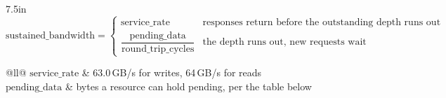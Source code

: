 \documentclass[border=8pt]{standalone}
\begin{document}
\begin{varwidth}{7.5in}
\[
  \mathrm{sustained\_bandwidth} =
  \begin{cases}
    \mathrm{service\_rate}
      & \text{responses return before the outstanding depth runs out}\\[1.2ex]
    \dfrac{\mathrm{pending\_data}}{\mathrm{round\_trip\_cycles}}
      & \text{the depth runs out, new requests wait}
  \end{cases}
\]
\begin{tabular}{@{}ll@{}}
  $\mathrm{service\_rate}$  & 63.0\,GB/s for writes, 64\,GB/s for reads\\
  $\mathrm{pending\_data}$  & bytes a resource can hold pending, per the table below\\
  \\
\end{tabular}
\end{varwidth}
\end{document}
